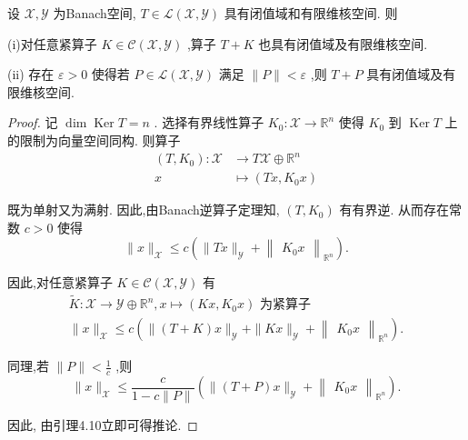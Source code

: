 \documentclass[lang=cn,newtx,10pt,scheme=chinese,thmcnt=chapter]{elegantbook}
\newcommand{\Ker}{\operatorname{Ker}}
\begin{document}
\begin{corollary}
    设 \(\mathcal{X},\mathcal{Y}\) 为Banach空间, \(T \in  \mathcal{L}\left( {\mathcal{X},\mathcal{Y}}\right)\) 具有闭值域和有限维核空间. 则

(i)对任意紧算子 \(K \in  \mathcal{C}\left( {\mathcal{X},\mathcal{Y}}\right)\) ,算子 \(T + K\) 也具有闭值域及有限维核空间.

(ii) 存在 \(\varepsilon  > 0\) 使得若 \(P \in  \mathcal{L}\left( {\mathcal{X},\mathcal{Y}}\right)\) 满足 \(\parallel P\parallel  < \varepsilon\) ,则 \(T + P\) 具有闭值域及有限维核空间.

\end{corollary}
\begin{proof}
记 \(\dim\Ker T = n\) . 选择有界线性算子 \({K}_{0} : \mathcal{X} \rightarrow  {\mathbb{R}}^{n}\) 使得 \({K}_{0}\) 到 \(\Ker
T\) 上的限制为向量空间同构. 则算子
\begin{equation*}
\begin{aligned} \left( {T,{K}_{0}}\right)  : \mathcal{X} &  \rightarrow  T\mathcal{X} \oplus  {\mathbb{R}}^{n} \\  x &  \mapsto  \left( {{Tx},{K}_{0}x}\right)  \end{aligned}
\end{equation*}

既为单射又为满射. 因此,由Banach逆算子定理知, \(\left( {T,{K}_{0}}\right)\) 有有界逆. 从而存在常数 \(c > 0\) 使得
\begin{equation*}
\parallel x{\parallel }_{\mathcal{X}} \leqslant  c\left( {\parallel {Tx}{\parallel }_{\mathcal{Y}} + {\begin{Vmatrix}{K}_{0}x\end{Vmatrix}}_{{\mathbb{R}}^{n}}}\right) .
\end{equation*}

因此,对任意紧算子 \(K \in  \mathcal{C}\left( {\mathcal{X},\mathcal{Y}}\right)\) 有
\begin{equation*}
\begin{aligned}
\widetilde{K}:\mathcal{ X}\to \mathcal{Y}\oplus \mathbb{R}^n,x\mapsto (Kx,K_0x)\textbf{ 为紧算子}\\
    \parallel x{\parallel }_{\mathcal{X}} \leqslant  c\left( {\parallel \left( {T + K}\right) x{\parallel }_{\mathcal{Y}} + \parallel {Kx}{\parallel }_{\mathcal{Y}} + {\begin{Vmatrix}{K}_{0}x\end{Vmatrix}}_{{\mathbb{R}}^{n}}}\right) .
\end{aligned}
\end{equation*}

同理,若 \(\parallel P\parallel  < \frac{1}{c}\) ,则
\begin{equation*}
\parallel x{\parallel }_{\mathcal{X}} \leqslant  \frac{c}{1 - c\parallel P\parallel }\left( {\parallel \left( {T + P}\right) x{\parallel }_{\mathcal{Y}} + {\begin{Vmatrix}{K}_{0}x\end{Vmatrix}}_{{\mathbb{R}}^{n}}}\right) .
\end{equation*}

因此, 由引理4.10立即可得推论.
\end{proof}
\end{document}
